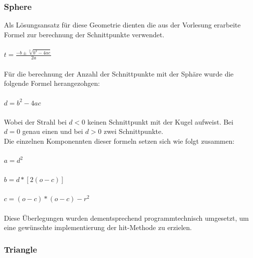 \documentclass[14pt]{extarticle}
\begin{document}
\subsubsection{Sphere}
Als Lösungsansatz für diese Geometrie dienten die aus der Vorlesung erarbeite Formel zur berechnung der Schnittpunkte verwendet.
\\\\\begin{math} t=\frac{-b\pm \sqrt[2]{b^2-4ac}}{2a}\end{math}\\\\
Für die berechnung der Anzahl der Schnittpunkte mit der Sphäre wurde die folgende Formel herangezohgen:
\\\\\begin{math} d=b^2-4ac\end{math}\\\\
Wobei der Strahl bei \begin{math}d < 0\end{math} keinen Schnittpunkt mit der Kugel aufweist. Bei \begin{math}d = 0\end{math} genau einen und bei \begin{math}d > 0\end{math} zwei Schnittpunkte.\\
Die einzelnen Komponennten dieser formeln setzen sich wie folgt zusammen:\\\\
\begin{math}a=d^2\end{math}\\\\
\begin{math}b=d*[2(o-c)]\end{math}\\\\
\begin{math}c=(o-c)*(o-c)-r^2\end{math}\\\\

Diese Überlegungen wurden dementsprechend programmtechnisch umgesetzt, um eine gewünschte implementierung der hit-Methode zu erzielen.
 

\subsubsection{Triangle}
\end{document}
